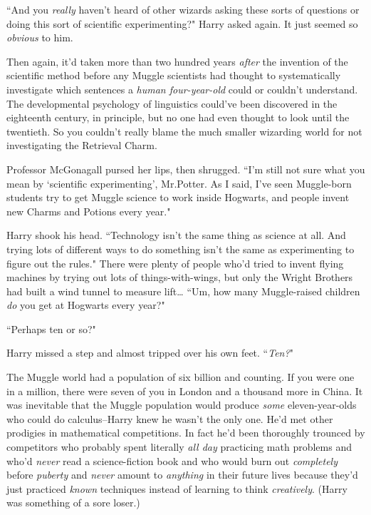 ``And you \emph{really} haven't heard of other wizards asking these sorts of questions or doing this sort of scientific experimenting?" Harry asked again. It just seemed so \emph{obvious} to him.

Then again, it'd taken more than two hundred years \emph{after} the invention of the scientific method before any Muggle scientists had thought to systematically investigate which sentences a \emph{human four-year-old} could or couldn't understand. The developmental psychology of linguistics could've been discovered in the eighteenth century, in principle, but no one had even thought to look until the twentieth. So you couldn't really blame the much smaller wizarding world for not investigating the Retrieval Charm.

Professor McGonagall pursed her lips, then shrugged. ``I'm still not sure what you mean by `scientific experimenting', Mr.\?Potter. As I said, I've seen Muggle-born students try to get Muggle science to work inside Hogwarts, and people invent new Charms and Potions every year."

Harry shook his head. ``Technology isn't the same thing as science at all. And trying lots of different ways to do something isn't the same as experimenting to figure out the rules." There were plenty of people who'd tried to invent flying machines by trying out lots of things-with-wings, but only the Wright Brothers had built a wind tunnel to measure lift{\ldots} ``Um, how many Muggle-raised children \emph{do} you get at Hogwarts every year?"

``Perhaps ten or so?"

Harry missed a step and almost tripped over his own feet. ``\emph{Ten?}"

The Muggle world had a population of six billion and counting. If you were one in a million, there were seven of you in London and a thousand more in China. It was inevitable that the Muggle population would produce \emph{some} eleven-year-olds who could do calculus\---Harry knew he wasn't the only one. He'd met other prodigies in mathematical competitions. In fact he'd been thoroughly trounced by competitors who probably spent literally \emph{all day} practicing math problems and who'd \emph{never} read a science-fiction book and who would burn out \emph{completely} before \emph{puberty} and \emph{never} amount to \emph{anything} in their future lives because they'd just practiced \emph{known} techniques instead of learning to think \emph{creatively}. (Harry was something of a sore loser.)

